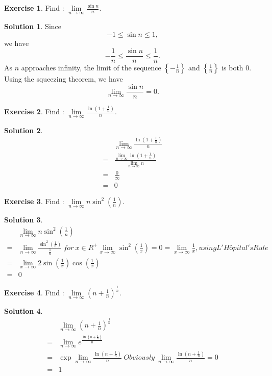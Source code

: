 \documentclass{article}
\theoremstyle{definition}
\newtheorem{exe}{Exercise}[section]
\newtheorem{sol}{Solution}[exe]
\begin{document}
\begin{exe}
Find : $\underset{n \to \infty}{\lim}\frac{\sin{n}}{n}.$
\end{exe}

\begin{sol}
    Since $$-1\leq \sin{n}\leq 1,$$ we have $$-\frac{1}{n}\leq \frac{\sin{n}}{n}\leq \frac{1}{n}.$$
    As $n$ approaches infinity, the limit of the sequence $\left\{-\frac{1}{n}\right\}$ and $\left\{\frac{1}{n}\right\}$ is both $0$. Using the squeezing theorem, we have $$\underset{n \to \infty}{\lim}\frac{\sin{n}}{n}=0.$$
\end{sol}

\begin{exe}
    Find : $\underset{n \to \infty}{\lim}\frac{\ln(1+\frac{1}{n})}{n}.$
\end{exe}
\begin{sol}
\begin{align*}
    &\underset{n \to \infty}{\lim}\frac{\ln(1+\frac{1}{n})}{n}\\
    =& \frac{\underset{n \to \infty}{\lim} \ln(1+\frac{1}{n})}{\underset{n \to \infty}{\lim} n}\\
    =&\frac{0}{\infty}\\
    =&0	
\end{align*}
\end{sol}

\begin{exe}
    Find : $\underset{n \to \infty}{\lim}n\sin^{2}(\frac{1}{n}).$
\end{exe}

\begin{sol}
    \begin{align*}
        &\underset{n \to \infty}{\lim}n\sin^{2}(\frac{1}{n})\\
        =& \underset{n \to \infty}{\lim}\frac{\sin^{2}(\frac{1}{n})}{\frac{1}{n}}\ for\ x\in R^{+} \lim_{x\to \infty}\sin^{2}(\frac{1}{x})=0=\lim_{x\to \infty}\frac{1}{x}, using L'Hôpital's Rule \\
        =& \underset{x \to \infty}{\lim} 2\sin(\frac{1}{x})\cos(\frac{1}{x})\\
        =& 0
    \end{align*}
\end{sol}


\begin{exe}
    Find : $\underset{n \to \infty}{\lim}(n+\frac{1}{n})^{\frac{1}{n}}.$
\end{exe}

\begin{sol}
    \begin{align*}
        &\underset{n \to \infty}{\lim}(n+\frac{1}{n})^{\frac{1}{n}}\\
        =& \underset{n \to \infty}{\lim}e^{\frac{\ln(n+\frac{1}{n})}{n}}\  \\
        =& \exp{\underset{n \to \infty}{\lim}\frac{\ln(n+\frac{1}{n})}{n}}\ Obviously\ \underset{n \to \infty}{\lim}\frac{\ln(n+\frac{1}{n})}{n}=0 \\
        =& 1
    \end{align*}
\end{sol}
\end{document}
